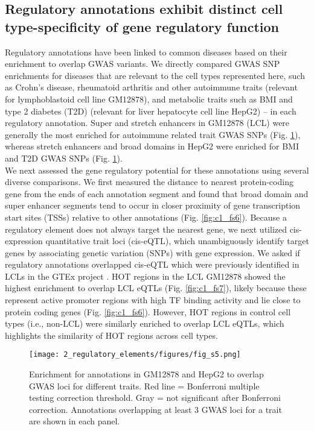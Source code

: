 \subsection{Regulatory annotations exhibit distinct cell type-specificity of gene regulatory function}
Regulatory annotations have been linked to common diseases based on their enrichment to overlap GWAS variants. We directly compared GWAS SNP enrichments for diseases that are relevant to the cell types represented here, such as Crohn’s disease, rheumatoid arthritis and other autoimmune traits (relevant for lymphoblastoid cell line GM12878), and metabolic traits such as \ac{BMI} and type 2 diabetes (T2D) (relevant for liver hepatocyte cell line HepG2) – in each regulatory annotation. Super and stretch enhancers in GM12878 (\ac{LCL}) were generally the most enriched for autoimmune related trait GWAS SNPs (Fig. \ref{fig:c1_fs5}), whereas stretch enhancers and broad domains in HepG2 were enriched for BMI and T2D GWAS SNPs (Fig. \ref{fig:c1_fs5}). \\
We next assessed the gene regulatory potential for these annotations using several diverse comparisons. We first measured the distance to nearest protein-coding gene from the ends of each annotation segment and found that broad domain and super enhancer segments tend to occur in closer proximity of gene transcription start sites (TSSs) relative to other annotations (Fig. \ref{fig:c1_fs6}). Because a regulatory element does not always target the nearest gene, we next utilized cis-expression quantitative trait loci (cis-eQTL), which unambiguously identify target genes by associating genetic variation (SNPs) with gene expression. We asked if regulatory annotations overlapped cis-eQTL which were previously identified in \ac{LCL}s in the \ac{GTEx} project \cite{gtexconsortiumGeneticEffectsGene2017}. HOT regions in the LCL GM12878 showed the highest enrichment to overlap LCL eQTLs (Fig. \ref{fig:c1_fs7}), likely because these represent active promoter regions with high TF binding activity and lie close to protein coding genes (Fig. \ref{fig:c1_fs6}). However, HOT regions in control cell types (i.e., non-LCL) were similarly enriched to overlap LCL eQTLs, which highlights the similarity of HOT regions across cell types. \\

\begin{figure}
    \centering
    \texttt{[image: 2\_regulatory\_elements/figures/fig\_s5.png]}
    \caption[Enrichment for annotations in GM12878 and HepG2 to overlap GWAS loci for different traits]{Enrichment for annotations in GM12878 and HepG2 to overlap GWAS loci for different traits. Red line = Bonferroni multiple testing correction threshold. Gray = not significant after Bonferroni correction. Annotations overlapping at least 3 GWAS loci for a trait are shown in each panel.}
    \label{fig:c1_fs5}
\end{figure}

